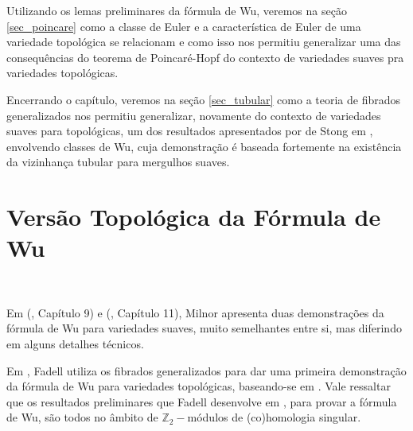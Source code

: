 \documentclass[12pt,oneside]{book} %
\newcommand{\Z}{\mathbb{Z}}
\begin{document}
\par Utilizando os lemas preliminares da fórmula de Wu, veremos na seção \ref{sec_poincare} como a classe de Euler e a característica de Euler de uma variedade topológica se relacionam e como isso nos permitiu generalizar uma das consequências do teorema de Poincaré-Hopf do contexto de variedades suaves pra variedades topológicas.

\par Encerrando o capítulo, veremos na seção \ref{sec_tubular} como a teoria de fibrados generalizados nos permitiu generalizar, novamente do contexto de variedades suaves para topológicas, um dos resultados apresentados por de Stong em \cite{stong}, envolvendo classes de Wu, cuja demonstração é baseada fortemente na existência da vizinhança tubular para mergulhos suaves.






\section{Versão Topológica da Fórmula de Wu}\label{sec_form_wu}

\

\par Em (\cite{milnor_2}, Capítulo 9) e (\cite{milnor_1}, Capítulo 11), Milnor apresenta duas demonstrações da fórmula de Wu para variedades suaves, muito semelhantes entre si, mas diferindo em alguns detalhes técnicos.

\par Em \cite{fadell_1}, Fadell utiliza os fibrados generalizados para dar uma primeira demonstração da fórmula de Wu para variedades topológicas, baseando-se em \cite{milnor_2}. Vale ressaltar que os resultados preliminares que Fadell desenvolve em \cite{fadell_1}, para provar a fórmula de Wu, são todos no âmbito de $\Z_{2}-$módulos de (co)homologia singular.
\end{document}
